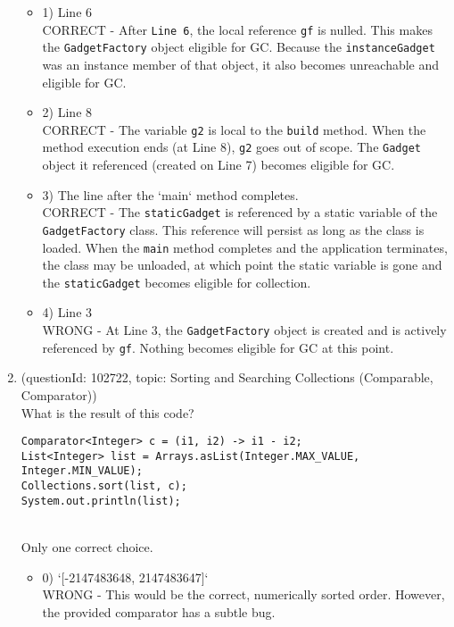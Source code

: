 \documentclass[12pt]{article}
\begin{document}
\begin{enumerate}[label=(\arabic*)]
\begin{itemize}
\item 1) Line 6
 \\ 
CORRECT - After \verb|Line 6|, the local reference \verb|gf| is nulled. This makes the \verb|GadgetFactory| object eligible for GC. Because the \verb|instanceGadget| was an instance member of that object, it also becomes unreachable and eligible for GC.

\item 2) Line 8
 \\ 
CORRECT - The variable \verb|g2| is local to the \verb|build| method. When the method execution ends (at Line 8), \verb|g2| goes out of scope. The \verb|Gadget| object it referenced (created on Line 7) becomes eligible for GC.

\item 3) The line after the `main` method completes.
 \\ 
CORRECT - The \verb|staticGadget| is referenced by a static variable of the \verb|GadgetFactory| class. This reference will persist as long as the class is loaded. When the \verb|main| method completes and the application terminates, the class may be unloaded, at which point the static variable is gone and the \verb|staticGadget| becomes eligible for collection.

\item 4) Line 3
 \\ 
WRONG - At Line 3, the \verb|GadgetFactory| object is created and is actively referenced by \verb|gf|. Nothing becomes eligible for GC at this point.

\end{itemize}
\item (questionId: 102722, topic: Sorting and Searching Collections (Comparable, Comparator)) \\ 
What is the result of this code?
\begin{verbatim}
Comparator<Integer> c = (i1, i2) -> i1 - i2;
List<Integer> list = Arrays.asList(Integer.MAX_VALUE, Integer.MIN_VALUE);
Collections.sort(list, c);
System.out.println(list);
\end{verbatim}
\\ \noindent Only one correct choice. 
\begin{itemize}
\item 0) `[-2147483648, 2147483647]`
 \\ 
WRONG - This would be the correct, numerically sorted order. However, the provided comparator has a subtle bug.


\end{itemize}
\end{enumerate}
\end{document}
